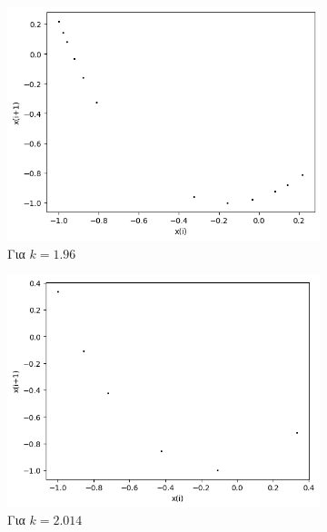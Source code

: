 \begin{figure}[ht]
	\centering
	\begin{subfigure}[b]{0.4\textwidth}
		\centering
		\includegraphics[width=\textwidth]{LateX images/cheb q=0.9/g4}
		\caption{Για $k=1.96$}
		\label{f:k142}
	\end{subfigure}
	\hfill
		\begin{subfigure}[b]{0.4\textwidth}
		\centering
		\includegraphics[width=\textwidth]{LateX images/cheb q=0.9/g5}
		\caption{Για $k=2.014$}
		\label{f:k143}
	\end{subfigure}
	\hfill
	\begin{subfigure}[b]{0.4\textwidth}
		\centering

\end{subfigure}
\end{figure}
